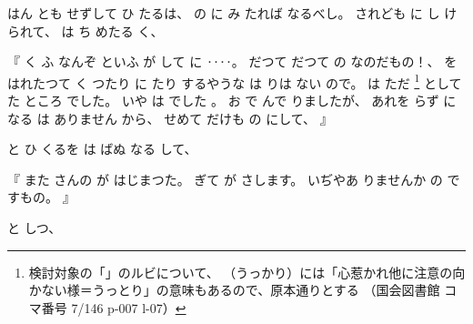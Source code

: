 
%
はん
とも
せずして
ひ
たるは、
%
の
に
み
たれば
なるべし。
%
されども
に
し
けられて、
%
は
ち
めたる
く、

%
『
く
ふ
なんぞ
といふ
が
して
に
‥‥。
%
だつて
だつて
の
なのだもの！、
%
を
はれたつて
く
つたり
に
たり
するやうな
は
りは
ない
ので。
%
は
ただ%
\footnote{%
検討対象の「」のルビについて、
（うっかり）には「心惹かれ他に注意の向かない様＝うっとり」の意味もあるので、原本通りとする
（国会図書館 コマ番号 7/146 p-007 l-07）
}%
として
た
ところ
でした。
%
いや
は
でした
。
%
%
お
で
んで
りましたが、
%
あれを
らず
に
なる
は
ありません
から、
%
せめて
だけも
の
にして、
』

%
と
ひ
くるを
は%
ばぬ
なる
して、

%
『
また
さんの
が
はじまつた。
%
ぎて
が
さします。
%
いぢやあ
りませんか
の
ですもの。
』

%
と
しつ、

